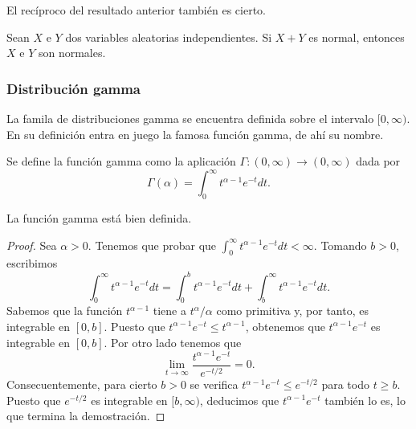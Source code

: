 \documentclass{article}
\begin{document}
El recíproco del resultado anterior también es cierto.

\begin{thm}[Cramer]
    Sean $X$ e $Y$ dos variables aleatorias independientes. Si $X+Y$ es normal, entonces $X$ e $Y$ son normales.
\end{thm}

\subsubsection{Distribución gamma}

La famila de distribuciones gamma se encuentra definida sobre el intervalo $[0, \infty)$. En su definición entra en juego la famosa función gamma, de ahí su nombre.

\begin{definition}
    Se define la función gamma como la aplicación $\Gamma: (0, \infty) \to (0, \infty)$ dada por
    \[\Gamma(\alpha) = \int_0^\infty t^{\alpha-1}e^{-t}dt.\]
\end{definition}
\begin{prop}
    La función gamma está bien definida.
\end{prop}
\begin{proof}
    Sea $\alpha > 0$. Tenemos que probar que $\int_0^\infty t^{\alpha-1}e^{-t}dt < \infty$. Tomando $b > 0$, escribimos
    \[\int_0^\infty t^{\alpha-1}e^{-t}dt = \int_0^b t^{\alpha-1}e^{-t}dt + \int_b^\infty t^{\alpha-1}e^{-t}dt.\]
    Sabemos que la función $t^{\alpha - 1}$ tiene a $t^{\alpha} / \alpha$ como primitiva y, por tanto, es integrable en $[0,b]$. Puesto que $t^{\alpha-1}e^{-t} \le t^{\alpha-1}$, obtenemos que $t^{\alpha-1}e^{-t}$ es integrable en $[0,b]$. Por otro lado tenemos que
    \[\lim_{t \to \infty} \frac{t^{\alpha-1}e^{-t}}{e^{-t / 2}} = 0.\]
    Consecuentemente, para cierto $b > 0$ se verifica $t^{\alpha-1}e^{-t} \le e^{-t / 2}$ para todo $t \ge b$. Puesto que $e^{-t / 2}$ es integrable en $[b, \infty)$, deducimos que $t^{\alpha-1}e^{-t}$ también lo es, lo que termina la demostración.
\end{proof}
\end{document}
